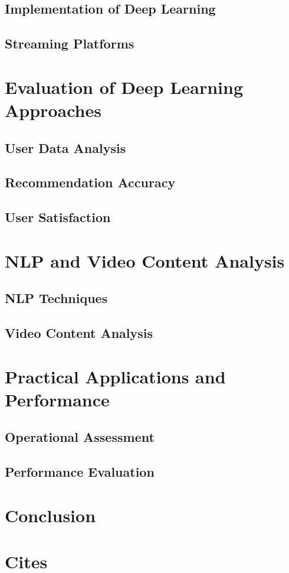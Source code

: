 \documentclass[12pt,english,a4paper]{article}
\begin{document}
\subsection{Implementation of Deep Learning}
\subsection{Streaming Platforms}

\section{Evaluation of Deep Learning Approaches}
\subsection{User Data Analysis}
\subsection{Recommendation Accuracy}
\subsection{User Satisfaction}

\section{NLP and Video Content Analysis}
\subsection{NLP Techniques}
\subsection{Video Content Analysis}

\section{Practical Applications and Performance}
\subsection{Operational Assessment}
\subsection{Performance Evaluation}

\section{Conclusion}

\section{Cites}
\cite{HLEDYJ-DeepLearning}
\cite{CN-RecSystem}
\cite{SNRJ-Movie}
\cite{PKSAA-Summarization}
\cite{NMY-Reinforcement}
\cite{RSN-Network}
\cite{YY-Multimodal}
\cite{CMF-Hybrid}
\cite{PHPAH-NLP}
\cite{SSSDD-Integration}

\newpage

\printbibliography
\end{document}
